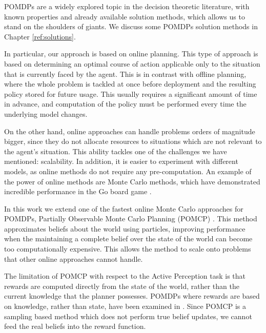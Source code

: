 POMDPs are a widely explored topic in the decision theoretic literature, with known properties
and already available solution methods, which allows us to stand on the shoulders of giants. We
discuss some POMDPs solution methods in Chapter \ref{ref:solutions}.


In particular, our approach is based on online planning. This type of approach is based on
determining an optimal course of action applicable only to the situation that is currently faced by
the agent. This is in contrast with offline planning, where the whole problem is tackled at once
before deployment and the resulting policy stored for future usage. This usually requires a
significant amount of time in advance, and computation of the policy must be performed every time
the underlying model changes.

On the other hand, online approaches can handle problems orders of magnitude bigger, since they do
not allocate resources to situations which are not relevant to the agent's situation. This ability
tackles one of the challenges we have mentioned: scalability. In addition, it is easier to
experiment with different models, as online methods do not require any pre-computation. An example
of the power of online methods are Monte Carlo methods, which have demonstrated incredible
performance in the Go board game \cite{cit:mcts}.

In this work we extend one of the fastest online Monte Carlo approaches for POMDPs, Partially
Observable Monte Carlo Planning (POMCP) \cite{cit:pomcp}. This method approximates beliefs about the
world using particles, improving performance when the maintaining a complete belief over the state
of the world can become too computationally expensive. This allows the method to scale onto problems
that other online approaches cannot handle.

The limitation of POMCP with respect to the Active Perception task is that rewards are computed
directly from the state of the world, rather than the current knowledge that the planner possesses.
POMDPs where rewards are based on knowledge, rather than state, have been examined in
\cite{cit:rpomdp}. Since POMCP is a sampling based method which does not perform true belief
updates, we cannot feed the real beliefs into the reward function.

